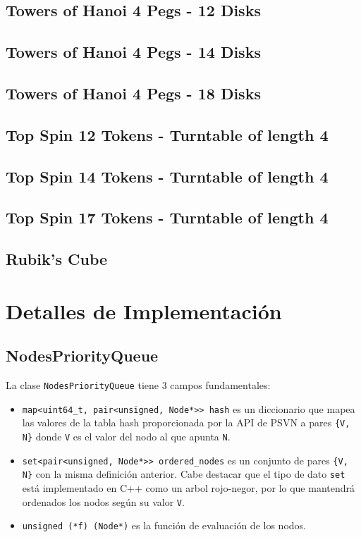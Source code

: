 \documentclass[a4paper,10pt]{article}
\begin{document}
  \subsection{Towers of Hanoi 4 Pegs - 12 Disks}

  \subsection{Towers of Hanoi 4 Pegs - 14 Disks}

  \subsection{Towers of Hanoi 4 Pegs - 18 Disks}

  \subsection{Top Spin 12 Tokens - Turntable of length 4}

  \subsection{Top Spin 14 Tokens - Turntable of length 4}

  \subsection{Top Spin 17 Tokens - Turntable of length 4}

  \subsection{Rubik's Cube}

\section{Detalles de Implementaci\'on}
  \subsection{NodesPriorityQueue}
    La clase \verb|NodesPriorityQueue| tiene 3 campos fundamentales:
    \begin{itemize}
      \item \verb|map<uint64_t, pair<unsigned, Node*>> hash| es un diccionario
      que mapea las valores de la tabla hash proporcionada por la API de PSVN
      a pares \verb|{V, N}| donde \verb|V| es el valor del nodo al que apunta
      \verb|N|.

      \item \verb|set<pair<unsigned, Node*>> ordered_nodes| es un conjunto de 
      pares \verb|{V, N}| con la misma definici\'on anterior. Cabe destacar 
      que el tipo de dato \verb|set| est\'a implementado en C++ como un arbol 
      rojo-negor, por lo que mantendr\'a ordenados los nodos seg\'un su valor 
      \verb|V|.

      \item \verb|unsigned (*f) (Node*)| es la funci\'on de evaluaci\'on de 
      los nodos.
    \end{itemize}
\end{document}
